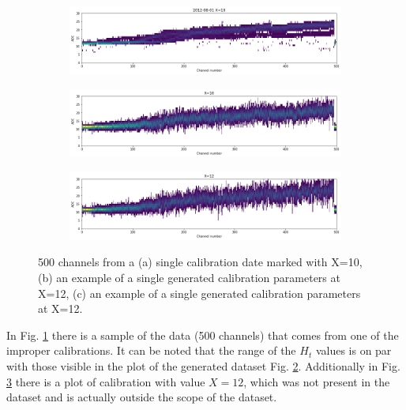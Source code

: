 \begin{figure}
    \centering
\begin{subfigure}[b]{\textwidth}
    \centering
    \includegraphics[width=0.7\linewidth]{figures/chapter4/outlierness/real_data.png}
    \caption{}
    \label{plot:real-data}
  \end{subfigure}

\begin{subfigure}[b]{\textwidth}
    \centering
    \includegraphics[width=0.7\linewidth]{figures/chapter4/outlierness/generated_data.png}
    \caption{}
    \label{plot:generated-data}
  \end{subfigure}


\begin{subfigure}[b]{\textwidth}
    \centering
    \includegraphics[width=0.7\linewidth]{figures/chapter4/outlierness/generated_x12.png}
    \caption{}
    \label{plot:generated-12}
  \end{subfigure}
    \caption{500 channels from a (a) single calibration date marked with X=10, (b) an example of a single generated calibration parameters at X=12, (c) an example of a single generated calibration parameters at X=12.}
    \label{plot:outlierness_data_example}
\end{figure}

In Fig. \ref{plot:real-data} there is a sample of the data (500 channels) that comes from one of the improper calibrations.
It can be noted that the range of the $H_{t}$ values is on par with those visible in the plot of the generated dataset Fig. \ref{plot:generated-data}.
 Additionally in Fig. \ref{plot:generated-12} there is a plot of calibration with value $X=12$, which was not present in the dataset and is actually outside the scope of the dataset.

